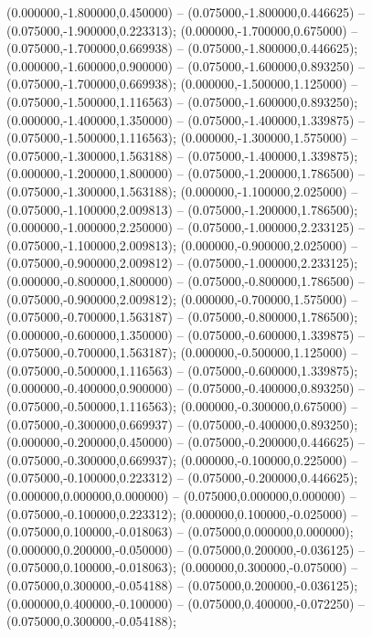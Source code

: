  (0.000000,-1.800000,0.450000) -- (0.075000,-1.800000,0.446625) -- (0.075000,-1.900000,0.223313);
 (0.000000,-1.700000,0.675000) -- (0.075000,-1.700000,0.669938) -- (0.075000,-1.800000,0.446625);
 (0.000000,-1.600000,0.900000) -- (0.075000,-1.600000,0.893250) -- (0.075000,-1.700000,0.669938);
 (0.000000,-1.500000,1.125000) -- (0.075000,-1.500000,1.116563) -- (0.075000,-1.600000,0.893250);
 (0.000000,-1.400000,1.350000) -- (0.075000,-1.400000,1.339875) -- (0.075000,-1.500000,1.116563);
 (0.000000,-1.300000,1.575000) -- (0.075000,-1.300000,1.563188) -- (0.075000,-1.400000,1.339875);
 (0.000000,-1.200000,1.800000) -- (0.075000,-1.200000,1.786500) -- (0.075000,-1.300000,1.563188);
 (0.000000,-1.100000,2.025000) -- (0.075000,-1.100000,2.009813) -- (0.075000,-1.200000,1.786500);
 (0.000000,-1.000000,2.250000) -- (0.075000,-1.000000,2.233125) -- (0.075000,-1.100000,2.009813);
 (0.000000,-0.900000,2.025000) -- (0.075000,-0.900000,2.009812) -- (0.075000,-1.000000,2.233125);
 (0.000000,-0.800000,1.800000) -- (0.075000,-0.800000,1.786500) -- (0.075000,-0.900000,2.009812);
 (0.000000,-0.700000,1.575000) -- (0.075000,-0.700000,1.563187) -- (0.075000,-0.800000,1.786500);
 (0.000000,-0.600000,1.350000) -- (0.075000,-0.600000,1.339875) -- (0.075000,-0.700000,1.563187);
 (0.000000,-0.500000,1.125000) -- (0.075000,-0.500000,1.116563) -- (0.075000,-0.600000,1.339875);
 (0.000000,-0.400000,0.900000) -- (0.075000,-0.400000,0.893250) -- (0.075000,-0.500000,1.116563);
 (0.000000,-0.300000,0.675000) -- (0.075000,-0.300000,0.669937) -- (0.075000,-0.400000,0.893250);
 (0.000000,-0.200000,0.450000) -- (0.075000,-0.200000,0.446625) -- (0.075000,-0.300000,0.669937);
 (0.000000,-0.100000,0.225000) -- (0.075000,-0.100000,0.223312) -- (0.075000,-0.200000,0.446625);
 (0.000000,0.000000,0.000000) -- (0.075000,0.000000,0.000000) -- (0.075000,-0.100000,0.223312);
 (0.000000,0.100000,-0.025000) -- (0.075000,0.100000,-0.018063) -- (0.075000,0.000000,0.000000);
 (0.000000,0.200000,-0.050000) -- (0.075000,0.200000,-0.036125) -- (0.075000,0.100000,-0.018063);
 (0.000000,0.300000,-0.075000) -- (0.075000,0.300000,-0.054188) -- (0.075000,0.200000,-0.036125);
 (0.000000,0.400000,-0.100000) -- (0.075000,0.400000,-0.072250) -- (0.075000,0.300000,-0.054188);
